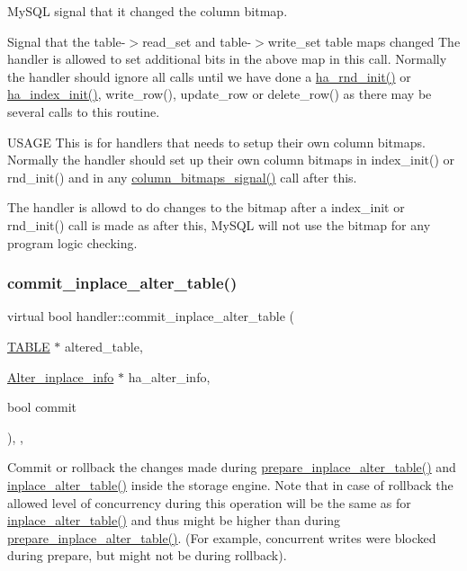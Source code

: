 My\+S\+QL signal that it changed the column bitmap. 

Signal that the table-\/$>$read\+\_\+set and table-\/$>$write\+\_\+set table maps changed The handler is allowed to set additional bits in the above map in this call. Normally the handler should ignore all calls until we have done a \mbox{\hyperlink{classhandler_afb5c99736cb400350e007578889b8375}{ha\+\_\+rnd\+\_\+init()}} or \mbox{\hyperlink{classhandler_a0af23462b249041a0db03c1c7139d76b}{ha\+\_\+index\+\_\+init()}}, write\+\_\+row(), update\+\_\+row or delete\+\_\+row() as there may be several calls to this routine.

U\+S\+A\+GE This is for handlers that needs to setup their own column bitmaps. Normally the handler should set up their own column bitmaps in index\+\_\+init() or rnd\+\_\+init() and in any \mbox{\hyperlink{classhandler_a4de97045e5381007565fd2b0da235c07}{column\+\_\+bitmaps\+\_\+signal()}} call after this.

The handler is allowd to do changes to the bitmap after a index\+\_\+init or rnd\+\_\+init() call is made as after this, My\+S\+QL will not use the bitmap for any program logic checking. \mbox{\label{classhandler_a0786a5f57ccd3c97bff07b1afeae9c06}} 
\subsubsection{\texorpdfstring{commit\+\_\+inplace\+\_\+alter\+\_\+table()}{commit\_inplace\_alter\_table()}}
{\footnotesize\ttfamily virtual bool handler\+::commit\+\_\+inplace\+\_\+alter\+\_\+table (\begin{DoxyParamCaption}\item[{\mbox{\hyperlink{structTABLE}{T\+A\+B\+LE}} $\ast$}]{altered\+\_\+table,  }\item[{\mbox{\hyperlink{classAlter__inplace__info}{Alter\+\_\+inplace\+\_\+info}} $\ast$}]{ha\+\_\+alter\+\_\+info,  }\item[{bool}]{commit }\end{DoxyParamCaption})\hspace{0.3cm}{\ttfamily [inline]}, {\ttfamily [protected]}, {\ttfamily [virtual]}}

Commit or rollback the changes made during \mbox{\hyperlink{classhandler_ab25b3931a457f1821ba55ae9cce79d98}{prepare\+\_\+inplace\+\_\+alter\+\_\+table()}} and \mbox{\hyperlink{classhandler_a90b4c3a8fe1c89c6ccfec1f4b144754a}{inplace\+\_\+alter\+\_\+table()}} inside the storage engine. Note that in case of rollback the allowed level of concurrency during this operation will be the same as for \mbox{\hyperlink{classhandler_a90b4c3a8fe1c89c6ccfec1f4b144754a}{inplace\+\_\+alter\+\_\+table()}} and thus might be higher than during \mbox{\hyperlink{classhandler_ab25b3931a457f1821ba55ae9cce79d98}{prepare\+\_\+inplace\+\_\+alter\+\_\+table()}}. (For example, concurrent writes were blocked during prepare, but might not be during rollback).


